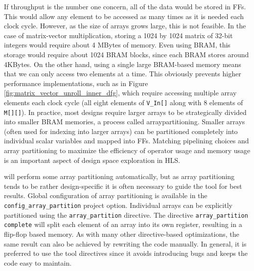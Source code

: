 If throughput is the number one concern, all of the data would be stored in FFs. This would allow any element to be accessed as many times as it is needed each clock cycle. However, as the size of arrays grows large, this is not feasible.  In the case of matrix-vector multiplication, storing a 1024 by 1024 matrix of 32-bit integers would require about 4 MBytes of memory.   Even using BRAM, this storage would require about 1024 BRAM blocks, since each BRAM stores around 4KBytes.  On the other hand, using a single large BRAM-based memory means that we can only access two elements at a time.  This obviously prevents higher performance implementations, such as in Figure \ref{fig:matrix_vector_unroll_inner_dfg}, which require accessing multiple array elements each clock cycle (all eight elements of \lstinline|V_In[]| along with 8 elements of \lstinline|M[][]|).  In practice, most designs require larger arrays to be strategically divided into smaller BRAM memories, a process called \gls{arraypartitioning}.  Smaller arrays (often used for indexing into larger arrays) can be partitioned completely into individual scalar variables and mapped into FFs.  Matching pipelining choices and array partitioning to maximize the efficiency of operator usage and memory usage is an important aspect of design space exploration in HLS.

\begin{aside}
\VHLS will perform some array partitioning automatically, but as array partitioning tends to be rather design-specific it is often necessary to guide the tool for best results.  Global configuration of array partitioning is available in the \lstinline|config_array_partition| project option.  Individual arrays can be explicitly partitioned using the \lstinline|array_partition| directive. The directive \lstinline|array_partition complete| will split each element of an array into its own register, resulting in a flip-flop based memory.  As with many other directive-based optimizations, the same result can also be achieved by rewriting the code manually.  In general, it is preferred to use the tool directives since it avoids introducing bugs and keeps the code easy to maintain.
\end{aside}



